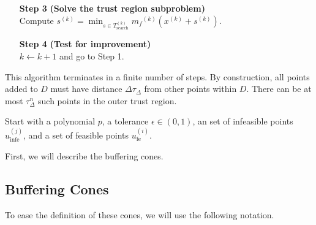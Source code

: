 \documentclass{article}
\theoremstyle{case}
\newcommand{\modelk}{{{m}_f}^{(k)}}
\newcommand{\iteratek}{{x}^{(k)}}
\newcommand{\trialk}{{{s}^{(k)}}}
\newcommand{\outertrk}{{T_{\text{out}}^{(k)}}}
\newcommand{\searchtrk}{{T_{\text{search}}^{(k)}}}
\newcommand{\feasiblek}{{F}^{(k)}}
\begin{document}
\begin{algorithm}[H]
\begin{itemize}
        \item[\textbf{Step 3}] \textbf{(Solve the trust region subproblem)} \\
            Compute $\trialk = \min_{s \in \searchtrk} \modelk(\iteratek + \trialk)$.
            
        \item[\textbf{Step 4}] \textbf{(Test for improvement)} \\
            $k \gets k+1$ and go to Step 1.
    \end{itemize}
\end{algorithm}



This algorithm terminates in a finite number of steps.
By construction, all points added to $D$ must have distance $\Delta  \tau_{\Delta}$ from other points within $D$.
There can be at most $\tau_{\Delta}^n$ such points in the outer trust region.


Start with a polynomial $p$, a tolerance $\epsilon \in (0, 1)$, an set of infeasible points $u_{\text{infe}}^{(j)}$, and a set of feasible points $u_{\text{fe}}^{(i)}$.




\color{black}





First, we will describe the buffering cones.


\subsection{Buffering Cones}
To ease the definition of these cones, we will use the following notation.
\end{document}

